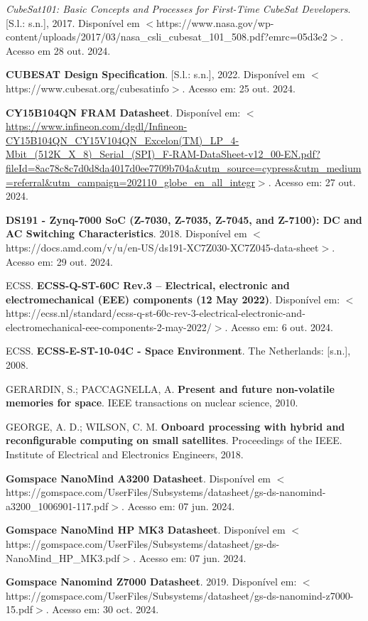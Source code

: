 \begin{flushleft}
\begin{thebibliography}{00}
 \textit{CubeSat101: Basic Concepts and Processes for First-Time CubeSat Developers}. [S.l.: s.n.], 2017. Disponível em $<$https://www.nasa.gov/wp-content/uploads/2017/03/nasa\_csli\_cubesat\_101\_508.pdf?emrc=05d3e2$>$. Acesso em 28 out. 2024.

 \textbf{CUBESAT Design Specification}. [S.l.: s.n.], 2022. Disponível em $<$https://www.cubesat.org/cubesatinfo$>$. Acesso em: 25 out. 2024.

 \textbf{CY15B104QN FRAM Datasheet}. Disponível em: $<$\url{https://www.infineon.com/dgdl/Infineon-CY15B104QN\_CY15V104QN\_Excelon(TM)\_LP\_4-Mbit\_(512K\_X\_8)\_Serial\_(SPI)\_F-RAM-DataSheet-v12\_00-EN.pdf?fileId=8ac78c8c7d0d8da4017d0ee7709b704a\&utm\_source=cypress\&utm\_medium=referral\&utm\_campaign=202110\_globe\_en\_all\_integr}$>$. Acesso em: 27 out. 2024.

 \textbf{DS191 - Zynq-7000 SoC (Z-7030, Z-7035, Z-7045, and Z-7100): DC and AC Switching Characteristics}. 2018. Disponível em $<$https://docs.amd.com/v/u/en-US/ds191-XC7Z030-XC7Z045-data-sheet$>$. Acesso em: 29 out. 2024.

 ECSS. \textbf{ECSS-Q-ST-60C Rev.3 – Electrical, electronic and electromechanical (EEE) components (12 May 2022)}. Disponível em: $<$https://ecss.nl/standard/ecss-q-st-60c-rev-3-electrical-electronic-and-electromechanical-eee-components-2-may-2022/$>$. Acesso em: 6 out. 2024.

 ECSS. \textbf{ECSS-E-ST-10-04C - Space Environment}. The Netherlands: [s.n.], 2008.

 GERARDIN, S.; PACCAGNELLA, A. \textbf{Present and future non-volatile memories for space}. IEEE transactions on nuclear science, 2010.

 GEORGE, A. D.; WILSON, C. M. \textbf{Onboard processing with hybrid and reconfigurable computing on small satellites}. Proceedings of the IEEE. Institute of Electrical and Electronics Engineers, 2018.

 \textbf{Gomspace NanoMind A3200 Datasheet}. Disponível em $<$https://gomspace.com/UserFiles/Subsystems/datasheet/gs-ds-nanomind-a3200\_1006901-117.pdf$>$. Acesso em: 07 jun. 2024.

 \textbf{Gomspace NanoMind HP MK3 Datasheet}. Disponível em $<$https://gomspace.com/UserFiles/Subsystems/datasheet/gs-ds-NanoMind\_HP\_MK3.pdf$>$. Acesso em: 07 jun. 2024.

 \textbf{Gomspace Nanomind Z7000 Datasheet}. 2019. Disponível em: $<$https://gomspace.com/UserFiles/Subsystems/datasheet/gs-ds-nanomind-z7000-15.pdf$>$. Acesso em: 30 oct. 2024.


\end{thebibliography}
\end{flushleft}
